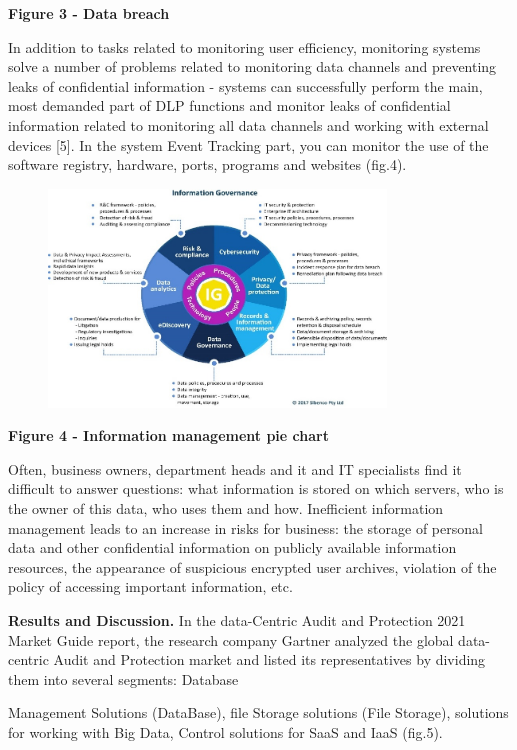 \textbf{Figure 3 - Data breach}

In addition to tasks related to monitoring user efficiency, monitoring
systems solve a number of problems related to monitoring data channels
and preventing leaks of confidential information - systems can
successfully perform the main, most demanded part of DLP functions and
monitor leaks of confidential information related to monitoring all data
channels and working with external devices {[}5{]}. In the system Event
Tracking part, you can monitor the use of the software registry,
hardware, ports, programs and websites (fig.4).

\begin{figure}[H]
	\centering
	\includegraphics[width=0.8\textwidth]{assets/66}
	\caption*{}
\end{figure}

\textbf{Figure 4 - Information management pie chart}

Often, business owners, department heads and it and IT specialists find
it difficult to answer questions: what information is stored on which
servers, who is the owner of this data, who uses them and how.
Inefficient information management leads to an increase in risks for
business: the storage of personal data and other confidential
information on publicly available information resources, the appearance
of suspicious encrypted user archives, violation of the policy of
accessing important information, etc.

\textbf{Results and Discussion.} In the data-Centric Audit and
Protection 2021 Market Guide report, the research company Gartner
analyzed the global data-centric Audit and Protection market and listed
its representatives by dividing them into several segments: Database

Management Solutions (DataBase), file Storage solutions (File Storage),
solutions for working with Big Data, Control solutions for SaaS and IaaS
(fig.5).

